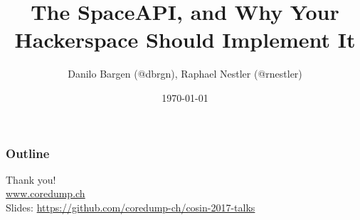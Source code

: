 \documentclass[aspectratio=1610,t]{beamer}
\title{The SpaceAPI, and Why Your Hackerspace Should Implement It}
\date{\today}
\author{Danilo Bargen (@dbrgn), Raphael Nestler (@rnestler)}
\institute{Coredump Rapperswil}
\begin{document}
\maketitle


\begin{frame}
	\frametitle{Outline}
	\setcounter{tocdepth}{1}
	\tableofcontents
\end{frame}






{
\begin{frame}[standout]
	\begin{centering}
	{\Huge Thank you!}\\
	{\normalsize \url{www.coredump.ch}}\\
	{\footnotesize Slides: \url{https://github.com/coredump-ch/cosin-2017-talks}}\\
	\end{centering}
\end{frame}
}
\end{document}
